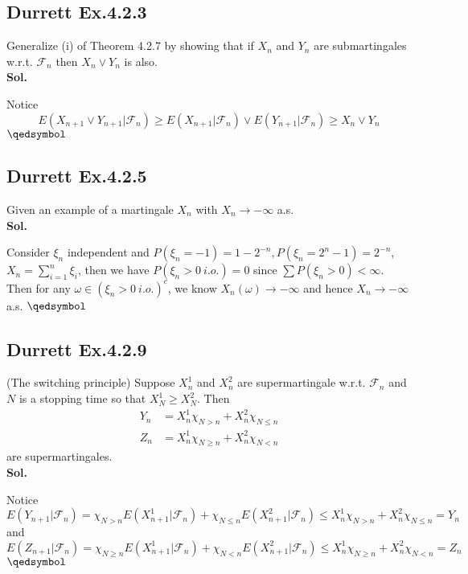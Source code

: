 \documentclass[lang=en,11pt,a4paper,citestyle =authoryear]{elegantpaper}
\newcommand{\prvd}{$\hfill \qedsymbol$}
\newcommand{\F}{\mathcal{F}}
\begin{document}
\subsection*{Durrett Ex.4.2.3} 
Generalize (i) of Theorem 4.2.7 by showing that if $X_n$ and $Y_n$ are submartingales w.r.t. $\F_n$ then $X_n \vee Y_n$ is also.
\vspace{0.5em}\\
\textbf{Sol.} \par
Notice
\[
E(X_{n+1} \vee Y_{n+1}|\F_n) \geq E(X_{n+1}|\F_n)\vee E(Y_{n+1}|\F_n) \geq X_{n} \vee Y_n
\]
\prvd
\vspace{0.5em}

\subsection*{Durrett Ex.4.2.5} 
Given an example of a martingale $X_n$ with $X_n \to -\infty$ a.s.
\vspace{0.5em}\\
\textbf{Sol.} \par
Consider $\xi_n$ independent and $P(\xi_n = -1) = 1 - 2^{-n}, P(\xi_n = 2^n-1) = 2^{-n}$, $X_n = \sum\limits_{i=1}^n \xi_i$, then we have $P(\xi_n > 0\ i.o.) = 0$ since $\sum P(\xi_n>0) < \infty$. Then for any $\omega \in (\xi_n > 0\ i.o.)^c$, we know $X_n(\omega) \to -\infty$ and hence $X_n \to - \infty$ a.s.
\prvd
\vspace{0.5em}

\subsection*{Durrett Ex.4.2.9} 
(The switching principle) Suppose $X_n^1$ and $X_n^2$ are supermartingale w.r.t. $\F_n$ and $N$ is a stopping time so that $X_N^1 \geq X_N^2$. Then
\[
\begin{aligned}
    Y_n &= X_n^1\chi_{N>n} + X_n^2\chi_{N\leq n} \\
    Z_n &= X_n^1\chi_{N\geq n} + X_n^2\chi_{N<n}
\end{aligned}
\]
are supermartingales.
\vspace{0.5em}\\
\textbf{Sol.} \par
    Notice
    \[ E(Y_{n+1}|\F_n) = \chi_{N > n}E(X_{n+1}^1|\F_n) + \chi_{N\leq n}E(X_{n+1}^2|\F_n) \leq X_n^1 \chi_{N>n}+ X_n^2\chi_{N\leq n} = Y_n\]
    and
    \[ E(Z_{n+1}|\F_n) = \chi_{N \geq n}E(X_{n+1}^1|\F_n) + \chi_{N < n}E(X_{n+1}^2|\F_n) \leq X_n^1 \chi_{N \geq n}+ X_n^2\chi_{N < n} = Z_n\]
\prvd
\vspace{0.5em}
\end{document}
